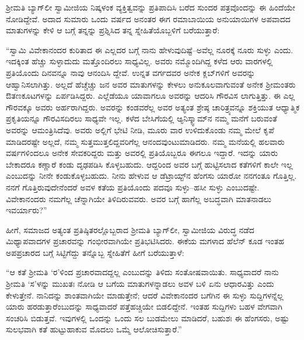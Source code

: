 ಶ್ರೀಮತಿ ಬ್ಯಾಗ್​ಲೀ ಸ್ವಾಮೀಜಿಯ ನಿಷ್ಕಳಂಕ ವ್ಯಕ್ತಿತ್ವವನ್ನು ಪ್ರತಿಪಾದಿಸಿ ಬರೆದ ಸುಂದರ ಪತ್ರವೊಂದನ್ನು ಈ ಹಿಂದೆಯೇ ನೋಡಿದ್ದೇವೆ. ಅದಾದ ಸುಮಾರು ಒಂದು ವರ್ಷದ ಅನಂತರ ಈಗ ರಮಾಬಾಯಿಯ ಅನುಯಾಯಿಗಳ ಅಪವಾದದ ಮಾತುಗಳನ್ನು ಕೇಳಿ ಆ ಬಗ್ಗೆ ತನ್ನನ್ನು ಪ್ರಶ್ನಿಸಿದ ತನ್ನ ಸ್ನೇಹಿತೆಯೊಬ್ಬಳಿಗೆ ಬರೆಯುತ್ತಾರೆ:

“ಸ್ವಾಮಿ ವಿವೇಕಾನಂದರ ಕುರಿತಾದ ಈ ಎಲ್ಲದರ ಬಗ್ಗೆ ನಾನು ಹೇಳುವುದಿಷ್ಟೆ–ಅವೆಲ್ಲ ನೂರಕ್ಕೆ ನೂರು ಸುಳ್ಳು ಎಂದು. ಇದಕ್ಕಿಂತ ಹೆಚ್ಚು ಸುಳ್ಳಾದುದು ಮತ್ತೊಂದಿರಲು ಸಾಧ್ಯವಿಲ್ಲ. ಅವರು ನಮ್ಮೊಂದಿಗಿದ್ದ ಕಳೆದ ಆರು ವಾರಗಳಲ್ಲಿ ಪ್ರತಿಯೊಂದು ದಿನವನ್ನೂ ನಾವು ಆನಂದಿಸಿ ದ್ದೇವೆ. ಉನ್ನತ ವರ್ಗದವರ ಅನೇಕ ಕ್ಲಬ್​ಗಳಿಗೆ ಅವರನ್ನು ಆಹ್ವಾನಿಸಲಾಗಿತ್ತು. ಅಲ್ಲದೆ ಹೆಚ್ಚೆಚ್ಚು ಜನ ಅವರ ಮಾತುಗಳನ್ನು ಕೇಳಲು ಅನುಕೂಲವಾಗುವಂತೆ ಅನೇಕ ಶ್ರೀಮಂತರು ಔತಣಕೂಟಗಳನ್ನು ಏರ್ಪಡಿಸಿದ್ದರು. ಎಲ್ಲೆಡೆಯೂ ಯಾವಾಗಲೂ ಅವರನ್ನು ಆದರಿಸಿ ಗೌರವಿಸ ಲಾಗುತ್ತಿತ್ತು. ಈ ಎಲ್ಲ ಗೌರವಕ್ಕೂ ಅವರು ಅರ್ಹರಾಗಿದ್ದರು. ಅವರನ್ನು ಕಂಡವರೆಲ್ಲ ಅವರ ಅತ್ಯಂತ ಶ್ರೇಷ್ಠ ಚಾರಿತ್ರ್ಯವನ್ನೂ ಶಕ್ತಿಯುತ ಆಧ್ಯಾತ್ಮಿಕ ಪ್ರಕೃತಿಯನ್ನೂ ಗೌರವಿಸದಿರಲು ಸಾಧ್ಯವೇ ಇಲ್ಲ. ಕಳೆದ ಬೇಸಿಗೆಯಲ್ಲಿ ಆ್ಯನಿಸ್ಕ್ವಾಮ್​ನ ನಮ್ಮ ಮನೆಗೆ ಬರುವಂತೆ ಅವರನ್ನು ಆಮಂತ್ರಿಸಿದೆವು. ಅವರು ಅಲ್ಲಿಗೆ ಭೇಟಿ ನೀಡಿ, ಮೂರು ವಾರ ಉಳಿದುಕೊಂಡು ನಮ್ಮ ಮೇಲೆ ಕೃಪೆ ಮಾಡಿದರಷ್ಟೇ ಅಲ್ಲದೆ, ನಮ್ಮ ಸುತ್ತಮುತ್ತಲಿದ್ದವರಿಗೆಲ್ಲ ಆನಂದವುಂಟುಮಾಡಿದರು. ನಮ್ಮ ಮನೆಯಲ್ಲಿ ಹಲವಾರು ವರ್ಷಗಳಿಂದಲೂ ಅನೇಕ ಸೇವಕರಿದ್ದರು ಮತ್ತು ಅವರಲ್ಲಿ ಪ್ರತಿಯೊಬ್ಬರೂ ಈಗಲೂ ಇದ್ದಾರೆ. ಇದನ್ನು ಯಾರು ಬೇಕಾದರೂ ಕಣ್ಣಾರೆ ಕಂಡು ದೃಢಪಡಿಸಿ ಕೊಳ್ಳಬಹುದು. ಆದ್ದರಿಂದ ಅವರ ಬಗ್ಗೆ ಹುಟ್ಟಿಸಲಾದ ಕತೆಗಳಿಗೆ ಕಾಲೇ ಇಲ್ಲ ಎಂಬುದನ್ನು ನೀನೇ ಕಂಡುಕೊಳ್ಳಬಹುದು. ನೀನು ಹೇಳುವ ಆ ಡೆಟ್ರಾಯ್ಟ್​ನ ಹೆಂಗಸು ಯಾರೋ ನನಗಂತೂ ಗೊತ್ತಿಲ್ಲ. ನನಗೆ ಗೊತ್ತಿರುವುದೇನೆಂದರೆ ಅವಳ ಕತೆಯ ಪ್ರತಿಯೊಂದು ಪದವೂ ಸುಳ್ಳು–ಹಸೀ ಸುಳ್ಳು ಎಂಬುದಷ್ಟೇ. ವಿವೇಕಾನಂದರು ನಮಗೆಲ್ಲ ಚೆನ್ನಾಗಿಯೇ ತಿಳಿದಿರುವವರು. ಅವರ ಬಗ್ಗೆ ಹಾಗೆಲ್ಲ ಅಬದ್ಧವಾಗಿ ಮಾತನಾಡಲು ಇವರ್ಯಾರು?”

ಹೀಗೆ, ಸಮಾಜದ ಅತ್ಯಂತ ಪ್ರತಿಷ್ಠಿತರಲ್ಲೊಬ್ಬರಾದ ಶ್ರೀಮತಿ ಬ್ಯಾಗ್​ಲೀ, ಸ್ವಾಮೀಜಿಯ ವಿರುದ್ಧ ನಡೆದ ಮಿಥ್ಯಾಪವಾದಗಳ ಪ್ರಚಾರವನ್ನು ಗಂಭೀರವಾಗಿಯೇ ಪ್ರತಿಭಟಿಸಿದರು. ಈಕೆಯ ಮಗಳಾದ ಹೆಲೆನ್ ಕೂಡ ಇಂತಹ ಅಪಪ್ರಚಾರದ ಬಗ್ಗೆ ಸಿಟ್ಟಿಗೆದ್ದು ತನ್ನೊಬ್ಬ ಸ್ನೇಹಿತೆಗೆ ಹೀಗೆ ಬರೆಯುತ್ತಾಳೆ:

“ಆ ಕತೆ ಶ್ರೀಮತಿ ‘ರ’ಳಿಂದ ಪ್ರಚಾರವಾದದ್ದಲ್ಲ ಎಂಬುದನ್ನು ತಿಳಿದು ಸಂತೋಷವಾಯಿತು. ಸಾಧ್ಯವಾದರೆ ನಾನು ಶ್ರೀಮತಿ ‘ಸ’ಳನ್ನು ಮುಖತಃ ನೋಡಿ ಆ ಬಗೆಯ ಮಾತುಗಳನ್ನಾಡಲು ಅವಳ ಬಳಿ ಏನು ಆಧಾರವಿತ್ತು ಎಂದು ಕೇಳುತ್ತೇನೆ. ನಾನಿದನ್ನು ಶಾಂತವಾಗಿಯೇ ಮಾಡುತ್ತೇನೆ; ಆದರೆ ವಿವೇಕಾನಂದರ ಬಗೆಗಿನ ಈ ಸುಳ್ಳು ಸುದ್ದಿಗಳನ್ನೆಲ್ಲ ಯಾರು ಹರಡುತ್ತಾರೆಂಬುದನ್ನು ಸಾಧ್ಯವಾದರೆ ಪತ್ತೆಹಚ್ಚಿಯೇ ಬಿಡಲಿದ್ದೇನೆ. ಇಂತಹ ಸುದ್ದಿಗಳು ಬಹಳ ವೇಗವಾಗಿ ಸಂಚರಿಸಿ ಬಿಡುತ್ತವೆ. ಇವುಗಳಲ್ಲಿ ಒಂದನ್ನು ಒಂದು ಸಲ ಬುಡಮೇಲು ಮಾಡಿದರೆ, ಬಹುಶಃ ಈ ಹೆಂಗಸರು, ಅಷ್ಟು ಸುಲಭವಾಗಿ ಕತೆ ಹುಟ್ಟುಹಾಕುವ ಮೊದಲು ಒಮ್ಮೆ ಆಲೋಚಿಸುತ್ತಾರೆ.”


